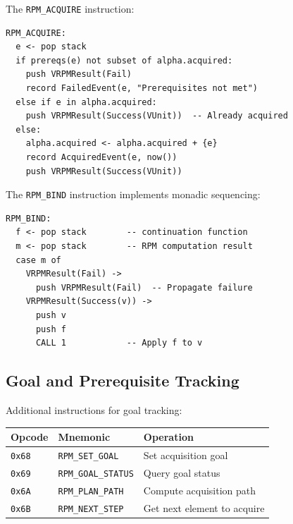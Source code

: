 \begin{definition}
\label{def:rpm-acquire-semantics}
The \texttt{RPM\_ACQUIRE} instruction:
\begin{verbatim}
RPM_ACQUIRE:
  e <- pop stack
  if prereqs(e) not subset of alpha.acquired:
    push VRPMResult(Fail)
    record FailedEvent(e, "Prerequisites not met")
  else if e in alpha.acquired:
    push VRPMResult(Success(VUnit))  -- Already acquired
  else:
    alpha.acquired <- alpha.acquired + {e}
    record AcquiredEvent(e, now())
    push VRPMResult(Success(VUnit))
\end{verbatim}
\end{definition}

\begin{definition}
\label{def:rpm-bind-semantics}
The \texttt{RPM\_BIND} instruction implements monadic sequencing:
\begin{verbatim}
RPM_BIND:
  f <- pop stack        -- continuation function
  m <- pop stack        -- RPM computation result
  case m of
    VRPMResult(Fail) ->
      push VRPMResult(Fail)  -- Propagate failure
    VRPMResult(Success(v)) ->
      push v
      push f
      CALL 1            -- Apply f to v
\end{verbatim}
\end{definition}

\subsection{Goal and Prerequisite Tracking}
\label{subsec:goal-tracking}

\begin{definition}
\label{def:goal-instructions}
Additional instructions for goal tracking:
\begin{center}
\begin{tabular}{llp{6.5cm}}
\toprule
\textbf{Opcode} & \textbf{Mnemonic} & \textbf{Operation} \\
\midrule
\texttt{0x68} & \texttt{RPM\_SET\_GOAL} & Set acquisition goal \\
\texttt{0x69} & \texttt{RPM\_GOAL\_STATUS} & Query goal status \\
\texttt{0x6A} & \texttt{RPM\_PLAN\_PATH} & Compute acquisition path \\
\texttt{0x6B} & \texttt{RPM\_NEXT\_STEP} & Get next element to acquire \\
\bottomrule
\end{tabular}
\end{center}
\end{definition}

